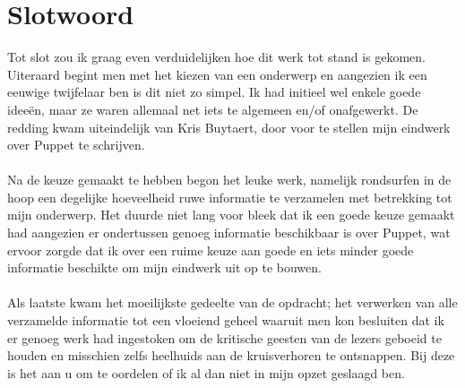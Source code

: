 \chapter*{Slotwoord}
Tot slot zou ik graag even verduidelijken hoe dit werk tot stand is gekomen. Uiteraard begint men met het kiezen van een onderwerp en aangezien ik een eeuwige twijfelaar ben is dit niet zo simpel. Ik had initieel wel enkele goede idee\"{e}n, maar ze waren allemaal net iets te algemeen en/of onafgewerkt. De redding kwam uiteindelijk van Kris Buytaert, door voor te stellen mijn eindwerk over Puppet te schrijven.\\\\
Na de keuze gemaakt te hebben begon het leuke werk, namelijk rondsurfen in de hoop een degelijke hoeveelheid ruwe informatie te verzamelen met betrekking tot mijn onderwerp. Het duurde niet lang voor bleek dat ik een goede keuze gemaakt had aangezien er ondertussen genoeg informatie beschikbaar is over Puppet, wat ervoor zorgde dat ik over een ruime keuze aan goede en iets minder goede informatie beschikte om mijn eindwerk uit op te bouwen.\\\\
Als laatste  kwam het moeilijkste gedeelte van de opdracht; het verwerken van alle verzamelde informatie tot een vloeiend geheel waaruit men kon besluiten dat ik er genoeg werk had ingestoken om de kritische geesten van de lezers geboeid te houden en misschien zelfs heelhuids aan de kruisverhoren te ontsnappen. Bij deze is het aan u om te oordelen of ik al dan niet in mijn opzet geslaagd ben.
